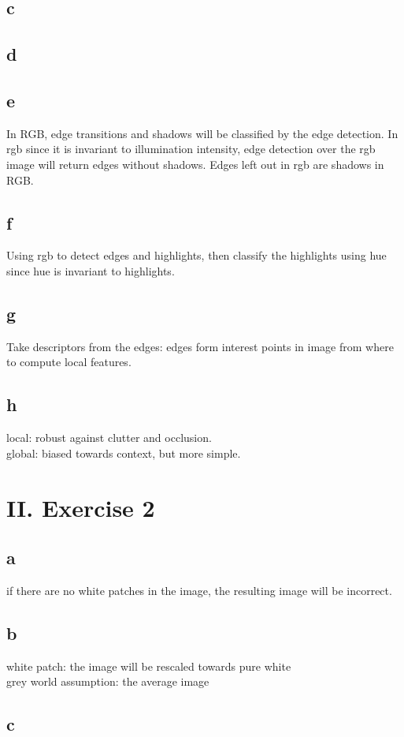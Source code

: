 \documentclass[a4paper,11pt]{article}
\begin{document}
	\subsection*{c}
	\subsection*{d}
	\subsection*{e}
	In RGB, edge transitions and shadows will be classified by the edge detection. In rgb since it is invariant to illumination intensity, edge detection over the rgb image will return edges without shadows. Edges left out in rgb are shadows in RGB.
	\subsection*{f}
	Using rgb to detect edges and highlights, then classify the highlights using hue since hue is invariant to highlights.
	\subsection*{g}
	Take descriptors from the edges: edges form interest points in image from where to compute local features.
	\subsection*{h}
	local: robust against clutter and occlusion. \\
	global:	biased towards context, but more simple.
	
	\section*{II. Exercise 2}
	\subsection*{a} 
	if there are no white patches in the image, the resulting image will be incorrect.
	\subsection*{b} 
	white patch: the image will be rescaled towards pure white \\ 
	grey world assumption: the average image
	\subsection*{c}
\end{document}
